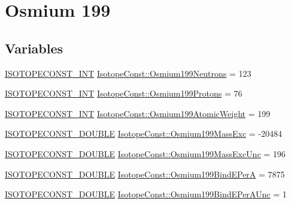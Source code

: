 \hypertarget{group___isotope_const-_osmium-_os199}{}\section{Osmium 199}
\label{group___isotope_const-_osmium-_os199}
\subsection*{Variables}
\begin{DoxyCompactItemize}
\item 
\mbox{\hyperlink{group___isotope_const-_macros_ga5f18360b3e99483a35c32d789e62621c}{I\+S\+O\+T\+O\+P\+E\+C\+O\+N\+S\+T\+\_\+\+I\+NT}} \mbox{\hyperlink{group___isotope_const-_osmium-_os199_gab718c7104a82600b6e9117e9c964b769}{Isotope\+Const\+::\+Osmium199\+Neutrons}} = 123
\item 
\mbox{\hyperlink{group___isotope_const-_macros_ga5f18360b3e99483a35c32d789e62621c}{I\+S\+O\+T\+O\+P\+E\+C\+O\+N\+S\+T\+\_\+\+I\+NT}} \mbox{\hyperlink{group___isotope_const-_osmium-_os199_gac4b725d8f628cd00d95f6f88ea95aa0c}{Isotope\+Const\+::\+Osmium199\+Protons}} = 76
\item 
\mbox{\hyperlink{group___isotope_const-_macros_ga5f18360b3e99483a35c32d789e62621c}{I\+S\+O\+T\+O\+P\+E\+C\+O\+N\+S\+T\+\_\+\+I\+NT}} \mbox{\hyperlink{group___isotope_const-_osmium-_os199_ga4545f35ab0c4f1dfa26cfdfd4f7ca408}{Isotope\+Const\+::\+Osmium199\+Atomic\+Weight}} = 199
\item 
\mbox{\hyperlink{group___isotope_const-_macros_ga8f45a7272ce02c0b4c65c44636ed719a}{I\+S\+O\+T\+O\+P\+E\+C\+O\+N\+S\+T\+\_\+\+D\+O\+U\+B\+LE}} \mbox{\hyperlink{group___isotope_const-_osmium-_os199_ga3b02853f1d2b7966b8464911ecbd0ffb}{Isotope\+Const\+::\+Osmium199\+Mass\+Exc}} = -\/20484
\item 
\mbox{\hyperlink{group___isotope_const-_macros_ga8f45a7272ce02c0b4c65c44636ed719a}{I\+S\+O\+T\+O\+P\+E\+C\+O\+N\+S\+T\+\_\+\+D\+O\+U\+B\+LE}} \mbox{\hyperlink{group___isotope_const-_osmium-_os199_gad635cb0757b1dc4a0fb08529264366fc}{Isotope\+Const\+::\+Osmium199\+Mass\+Exc\+Unc}} = 196
\item 
\mbox{\hyperlink{group___isotope_const-_macros_ga8f45a7272ce02c0b4c65c44636ed719a}{I\+S\+O\+T\+O\+P\+E\+C\+O\+N\+S\+T\+\_\+\+D\+O\+U\+B\+LE}} \mbox{\hyperlink{group___isotope_const-_osmium-_os199_gad5027a6e74c41cbcc663877b5fd42362}{Isotope\+Const\+::\+Osmium199\+Bind\+E\+PerA}} = 7875
\item 
\mbox{\hyperlink{group___isotope_const-_macros_ga8f45a7272ce02c0b4c65c44636ed719a}{I\+S\+O\+T\+O\+P\+E\+C\+O\+N\+S\+T\+\_\+\+D\+O\+U\+B\+LE}} \mbox{\hyperlink{group___isotope_const-_osmium-_os199_ga5bfb28ab241556bfdfde14dcb378b539}{Isotope\+Const\+::\+Osmium199\+Bind\+E\+Per\+A\+Unc}} = 1

\end{DoxyCompactItemize}
